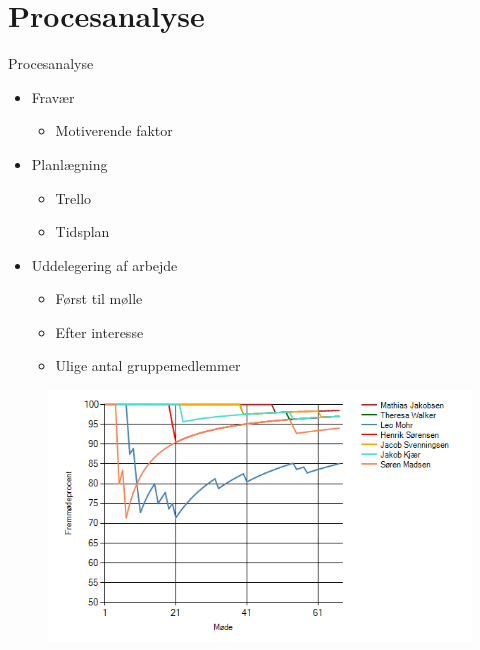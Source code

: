 
\section{Procesanalyse}
\begin{frame}{Procesanalyse}{}
	\begin{itemize}
    \item Fravær
        \begin{itemize}
            \item Motiverende faktor
        \end{itemize}
    \item Planlægning
        \begin{itemize}
            \item Trello
            \item Tidsplan
        \end{itemize}
		\item Uddelegering af arbejde
        \begin{itemize}
            \item Først til mølle
            \item Efter interesse
            \item Ulige antal gruppemedlemmer
        \end{itemize}
	\end{itemize}
  
  \begin{figure}
    \centering
    \includegraphics[width=.6\textwidth]{figures/graph.png}
  \end{figure}
  
\end{frame}

